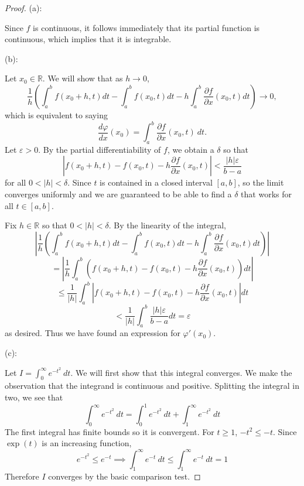 \documentclass{article}
\theoremstyle{plain} %
\numberwithin{thm}{section} %
\theoremstyle{definition}
\begin{document}
        \begin{proof}
            (a):

            Since \(f\) is continuous, it follows immediately that its partial function is continuous, which implies that it is integrable.

            (b):

            Let \(x_0 \in \mathbb{R}\). We will show that as \(h\to 0\), \[\frac{1}{h} \left(\int _a^b f(x_0 + h,t)dt - \int _a^b f(x_0, t)dt - h\int _a^b \frac{\partial f}{\partial x} (x_0,t)dt\right) \to 0,\] which is equivalent to saying
            \[
                \dfrac{d\varphi}{dx}(x_0) = \int_a^b \dfrac{\partial f}{\partial x}(x_0,t) \ dt.
            \]
            Let \(\varepsilon > 0\). By the partial differentiability of \(f\), we obtain a \(\delta\) so that \[\left\vert f(x_0 + h, t) - f(x_0, t) - h\frac{\partial f}{\partial x}(x_0, t) \right\vert < \dfrac{|h|\varepsilon}{b-a}\] for all \(0 < |h| <\delta\). Since \(t\) is contained in a closed interval \([a,b]\), so the limit converges uniformly and we are guaranteed to be able to find a \(\delta\) that works for all \(t \in [a,b]\).
            
            Fix \(h \in \mathbb{R}\) so that \(0 < |h| <\delta\). By the linearity of the integral,
            \[
                \left\vert \frac{1}{h} \left(\int _a^b f(x_0 + h,t)dt - \int _a^b f(x_0, t)dt - h\int _a^b \frac{\partial f}{\partial x} (x_0,t)dt\right) \right\vert
            \]
            \[
                = \left\vert\frac{1}{h}\int _a^b (f(x_0 + h, t) - f(x_0, t) - h\frac{\partial f}{\partial x} (x_0,t))dt\right\vert 
            \]
            \[
                \leq \frac{1}{|h|} \int _a^b \left\vert f(x_0 + h, t) - f(x_0, t) - h\frac{\partial f}{\partial x} (x_0,t) \right\vert dt
            \]
            \[
                < \frac{1}{|h|}\int _a^b \frac{|h|\varepsilon}{b-a}dt =\varepsilon
            \]
            as desired. Thus we have found an expression for \(\varphi ' (x_0)\).

            (c):

            Let \(I = \int _0^{\infty} e^{-t^2}\ dt\). We will first show that this integral converges. We make the observation that the integrand is continuous and positive. Splitting the integral in two, we see that
            \[
                \int _0^{\infty} e^{-t^2}\ dt = \int _0^{1} e^{-t^2}\ dt + \int _1^{\infty} e^{-t^2}\ dt
            \]
            The first integral has finite bounds so it is convergent. For \(t \geq 1\), \(-t^2 \leq -t\). Since \(\exp (t)\) is an increasing function,
            \[
                e^{-t^2} \leq e^{-t} \implies \int _1^{\infty} e^{-t}\ dt \leq \int _1^{\infty} e^{-t}\ dt = 1
            \]
            Therefore \(I\) converges by the basic comparison test.
            

\end{proof}
\end{document}
